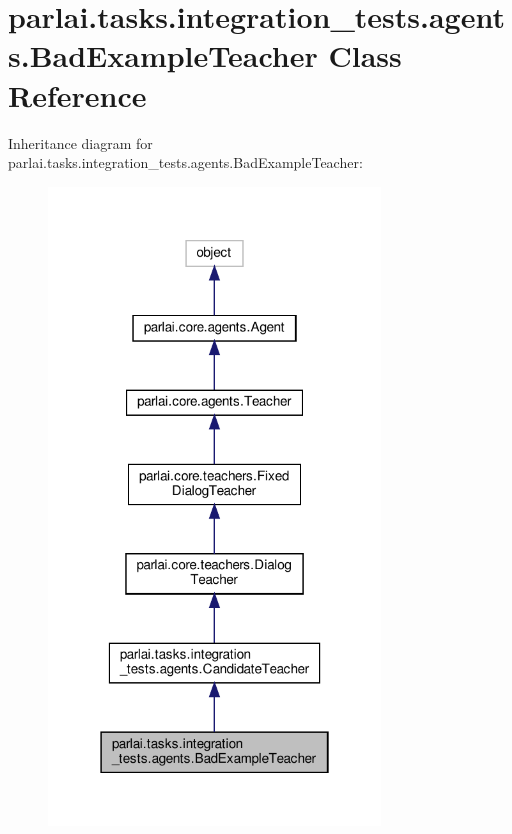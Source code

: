 \hypertarget{classparlai_1_1tasks_1_1integration__tests_1_1agents_1_1BadExampleTeacher}{}\section{parlai.\+tasks.\+integration\+\_\+tests.\+agents.\+Bad\+Example\+Teacher Class Reference}
\label{classparlai_1_1tasks_1_1integration__tests_1_1agents_1_1BadExampleTeacher}


Inheritance diagram for parlai.\+tasks.\+integration\+\_\+tests.\+agents.\+Bad\+Example\+Teacher\+:
\nopagebreak
\begin{figure}[H]
\begin{center}
\leavevmode
\includegraphics[width=250pt]{classparlai_1_1tasks_1_1integration__tests_1_1agents_1_1BadExampleTeacher__inherit__graph}
\end{center}
\end{figure}


